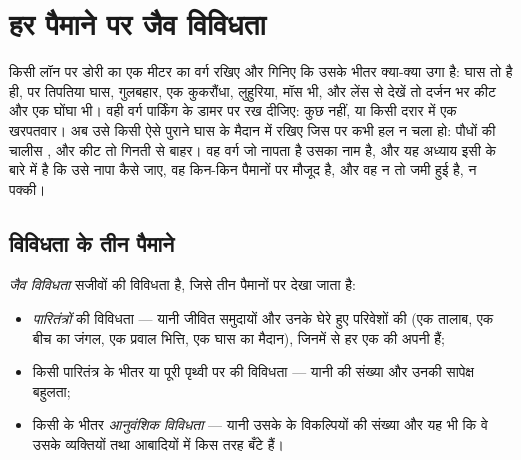 \chapter{हर पैमाने पर जैव विविधता}\label{ch:g10:biodiversity-scales}

किसी लॉन पर डोरी का एक मीटर का वर्ग रखिए और गिनिए कि उसके भीतर क्या-क्या
उगा है: घास तो है ही, पर तिपतिया घास, गुलबहार, एक कुकरौंधा, लुहुरिया,
मॉस भी, और लेंस से देखें तो दर्जन भर कीट और एक घोंघा भी। वही वर्ग पार्किंग
के डामर पर रख दीजिए: कुछ नहीं, या किसी दरार में एक खरपतवार। अब उसे किसी
ऐसे पुराने घास के मैदान में रखिए जिस पर कभी हल न चला हो: पौधों की चालीस
, और कीट तो गिनती से बाहर। वह वर्ग जो नापता है उसका नाम
\emph{} है, और यह अध्याय इसी के बारे में है कि उसे नापा कैसे
जाए, वह किन-किन पैमानों पर मौजूद है, और वह न तो जमी हुई है, न पक्की।

\section{विविधता के तीन पैमाने}

\begin{definition}[जैव विविधता]\label{def:g10:biodiversity-scales:biodiversity}
\emph{जैव विविधता} सजीवों की विविधता है, जिसे तीन
पैमानों पर देखा जाता है:
\begin{itemize}
  \item \emph{पारितंत्रों} की विविधता --- यानी जीवित
        समुदायों और उनके घेरे हुए परिवेशों की (एक तालाब, एक बीच का जंगल,
        एक प्रवाल भित्ति, एक घास का मैदान), जिनमें से हर एक की अपनी
         हैं;
  \item किसी पारितंत्र के भीतर या पूरी पृथ्वी पर  की विविधता
        --- यानी  की संख्या और उनकी सापेक्ष बहुलता;
  \item किसी  के भीतर
        \emph{आनुवंशिक विविधता} --- यानी उसके
         के विकल्पियों की संख्या और यह भी कि वे उसके व्यक्तियों तथा
        आबादियों में किस तरह बँटे हैं।
\end{itemize}
\end{definition}

